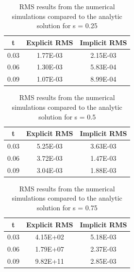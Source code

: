 \documentclass[twocolumn,10pt]{asme2ej}
\begin{document}
\begin{table}[h]
\begin{center}
\label{table_results2}
\begin{tabular}{|c | c c|}
\hline
t & Explicit RMS & Implicit RMS \\
\hline
0.03 & 1.77E-03 & 2.15E-03\\
0.06 & 1.30E-03 & 5.83E-04\\
0.09 & 1.07E-03 & 8.99E-04\\
\hline
\end{tabular}
\caption{RMS results from the numerical simulations compared to the analytic solution for s = 0.25}
\end{center}
\end{table}

\begin{table}[h]
\begin{center}
\label{table_results3}
\begin{tabular}{|c | c c|}
\hline
t & Explicit RMS & Implicit RMS \\
\hline
0.03 & 5.25E-03 & 3.63E-03\\
0.06 & 3.72E-03 & 1.47E-03\\
0.09 & 3.04E-03 & 1.88E-03\\
\hline
\end{tabular}
\caption{RMS results from the numerical simulations compared to the analytic solution for s = 0.5}
\end{center}
\end{table}

\begin{table}[h]
\begin{center}
\label{table_results4}
\begin{tabular}{|c | c c|}
\hline
t & Explicit RMS & Implicit RMS \\
\hline
0.03 & 4.15E+02 & 5.18E-03\\
0.06 & 1.79E+07 & 2.37E-03\\
0.09 & 9.82E+11 & 2.85E-03\\
\hline
\end{tabular}
\caption{RMS results from the numerical simulations compared to the analytic solution for s = 0.75}
\end{center}
\end{table}
\end{document}
